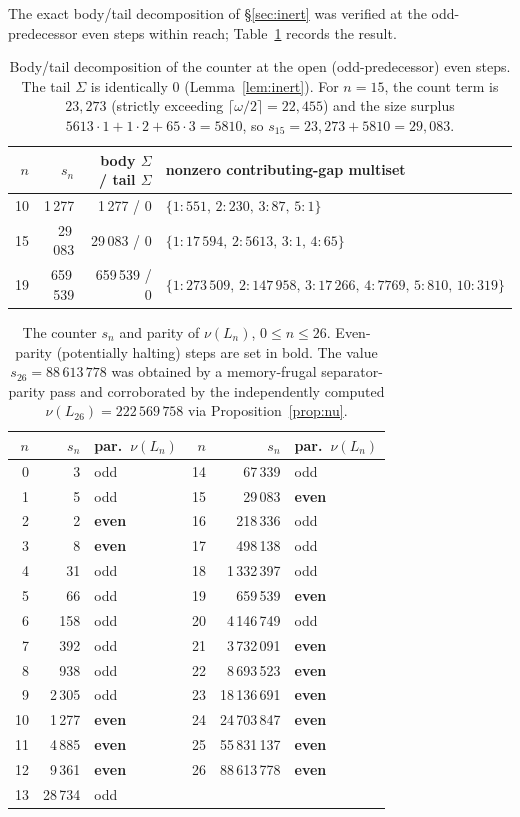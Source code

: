 \documentclass[11pt,reqno]{amsart}
\theoremstyle{plain}
\theoremstyle{definition}
\theoremstyle{remark}
\begin{document}
The exact body/tail decomposition of \S\ref{sec:inert} was verified at the odd-predecessor even steps within reach; Table~\ref{tab:decomp} records the result.

\begin{table}[h]\centering
\begin{tabular}{rrr|l}
$n$ & $s_n$ & body $\Sigma$ / tail $\Sigma$ & nonzero contributing-gap multiset\\
\hline
10 & 1\,277 & 1\,277 / 0 & $\{1:551,\,2:230,\,3:87,\,5:1\}$\\
15 & 29\,083 & 29\,083 / 0 & $\{1:17\,594,\,2:5613,\,3:1,\,4:65\}$\\
19 & 659\,539 & 659\,539 / 0 & $\{1:273\,509,\,2:147\,958,\,3:17\,266,\,4:7769,\,5:810,\,10:319\}$
\end{tabular}
\caption{Body/tail decomposition of the counter at the open (odd-predecessor) even steps. The tail $\Sigma$ is identically $0$ (Lemma~\ref{lem:inert}). For $n=15$, the count term is $23{,}273$ (strictly exceeding $\lceil\omega/2\rceil=22{,}455$) and the size surplus $5613\cdot 1+1\cdot 2+65\cdot 3=5810$, so $s_{15}=23{,}273+5810=29{,}083$.}
\label{tab:decomp}
\end{table}

\begin{table}[h]\centering
\begin{tabular}{rrl|rrl}
$n$ & $s_n$ & par.\ $\nu(L_n)$ & $n$ & $s_n$ & par.\ $\nu(L_n)$\\
\hline
0 & 3 & odd & 14 & 67\,339 & odd\\
1 & 5 & odd & 15 & 29\,083 & \textbf{even}\\
2 & 2 & \textbf{even} & 16 & 218\,336 & odd\\
3 & 8 & \textbf{even} & 17 & 498\,138 & odd\\
4 & 31 & odd & 18 & 1\,332\,397 & odd\\
5 & 66 & odd & 19 & 659\,539 & \textbf{even}\\
6 & 158 & odd & 20 & 4\,146\,749 & odd\\
7 & 392 & odd & 21 & 3\,732\,091 & \textbf{even}\\
8 & 938 & odd & 22 & 8\,693\,523 & \textbf{even}\\
9 & 2\,305 & odd & 23 & 18\,136\,691 & \textbf{even}\\
10 & 1\,277 & \textbf{even} & 24 & 24\,703\,847 & \textbf{even}\\
11 & 4\,885 & \textbf{even} & 25 & 55\,831\,137 & \textbf{even}\\
12 & 9\,361 & \textbf{even} & 26 & 88\,613\,778 & \textbf{even}\\
13 & 28\,734 & odd & & &
\end{tabular}
\caption{The counter $s_n$ and parity of $\nu(L_n)$, $0\le n\le 26$. Even-parity (potentially halting) steps are set in bold. The value $s_{26}=88\,613\,778$ was obtained by a memory-frugal separator-parity pass and corroborated by the independently computed $\nu(L_{26})=222\,569\,758$ via Proposition~\ref{prop:nu}.}
\label{tab:traj}
\end{table}
\end{document}
